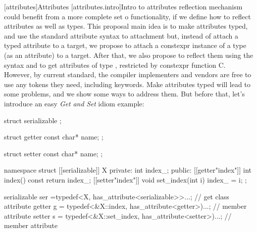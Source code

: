 [attributes]{Attributes}
[attributes.intro]{Intro to attributes}
\Cpp reflection mechanism could benefit from a more complete set o functionality, if we define how to reflect attributes as well as types. This proposal main idea is to make attributes typed, and use the standard attribute syntax \tcode{[[]]} to attachment but, instead of attach a typed attribute to a target, we propose to attach a constexpr instance of a type (as an attribute) to a target. After that, we also propose to reflect them using the syntax  and  to get attributes of type , restricted by constexpr  function C. However, by current standard, the compiler implementers and vendors are free to use any tokens they need, including keywords. Make attributes typed will lead to some problems, and we show some ways to address them. But before that, let's introduce an easy \emph{Get and Set} idiom example:
\begin{codeblock}
struct serializable {
};

struct getter { 
 const char* name;
};

struct setter { 
 const char* name;
};

namespace 
struct [[serializable]] X {
private:
 int index_;
public:
 [[getter{"index"}]] int index() const { return index_; }
 [[setter{"index"}]] void set_index(int i) { index_ = i; }
};

serializable ser =typedef<X, has_attribute<serializable>>...; // get class attribute
getter g = typedef<&X::index, has_attribute<getter>)...;      // member attribute
setter s = typedef<&X::set_index, has_attribute<setter>)...;  // member attribute
\end{codeblock}

